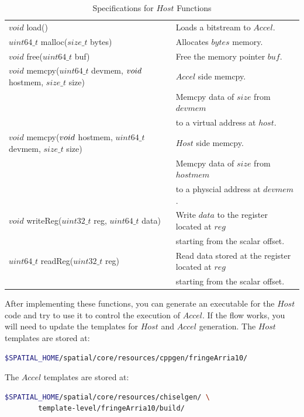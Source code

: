 \documentclass{article}
\begin{document}
    \begin{table}[t]
    \centering
    \scriptsize
    \begin{tabular}{ll}
       $void$ load() & Loads a bitstream to $Accel$. \\
       $uint64\_t$ malloc($size\_t$ bytes) & Allocates $bytes$ memory. \\
       $void$ free($uint64\_t$ buf) & Free the memory pointer $buf$. \\
       $void$ memcpy($uint64\_t$ devmem, $void\*$ hostmem, $size\_t$ size) & $Accel$ side memcpy. \\ 
       & Memcpy data of $size$ from $devmem$ \\
       & to a virtual address at $host$. \\
       $void$ memcpy($void\*$ hostmem, $uint64\_t$ devmem, $size\_t$ size) & $Host$ side memcpy. \\
       & Memcpy data of $size$ from $hostmem$ \\
       & to a physcial address at $devmem$. \\
       $void$ writeReg($uint32\_t$ reg, $uint64\_t$ data) & Write $data$ to the register located at $reg$ \\
       & starting from the scalar offset. \\
       $uint64\_t$ readReg($uint32\_t$ reg) & Read data stored at the register located at $reg$ \\
       & starting from the scalar offset.
    \end{tabular}
      \caption{Specifications for $Host$ Functions}
      \label{API}
    \end{table}
    
    After implementing these functions, you can generate an executable for the $Host$ code and try to use it to control the execution of $Accel$.
    If the flow works, you will need to update the templates for $Host$ and $Accel$ generation.
    The $Host$ templates are stored at:
    \begin{lstlisting}[language=bash]
    $SPATIAL_HOME/spatial/core/resources/cppgen/fringeArria10/
    \end{lstlisting}
    
    The $Accel$ templates are stored at:
    \begin{lstlisting}[language=bash]
    $SPATIAL_HOME/spatial/core/resources/chiselgen/ \
        template-level/fringeArria10/build/
    \end{lstlisting}
    
\end{document}
